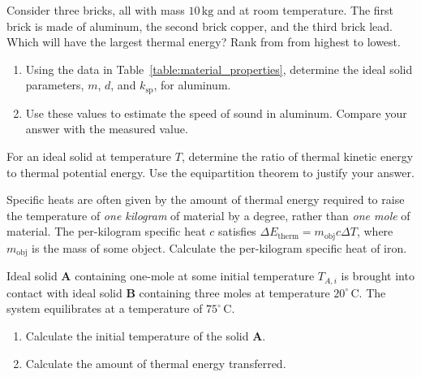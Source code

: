 \begin{exercise}
  Consider three bricks, all with mass $10\,\text{kg}$ and at room
  temperature. The first brick is made of aluminum, the second brick
  copper, and the third brick lead.  Which will have the largest thermal
  energy?  Rank from from highest to lowest.
\label{problem:compare_heat_capacity}
\end{exercise}

\begin{exercise}
\begin{enumerate}
\item Using the data in Table~\ref{table:material_properties}, 
determine the ideal solid
parameters, $m$, $d$, and $k_\text{sp}$, for aluminum.
\item Use these values to estimate the speed of sound in aluminum.  Compare
your answer with the measured value.
\end{enumerate}
\end{exercise}


\begin{exercise}
  For an ideal solid at temperature $T$, determine the ratio of
  thermal kinetic energy to thermal potential energy.  Use the
  equipartition theorem to justify your answer.
\end{exercise}


\begin{exercise}
Specific heats are often given by the amount of thermal energy
required to raise the temperature of \textit{one kilogram} of material by
a degree, rather than \textit{one mole} of material.  The per-kilogram
specific heat $c$ satisfies $\Delta E_\text{therm} = m_\text{obj} c
\Delta T$, where $m_\text{obj}$ is the mass of some object. Calculate
the per-kilogram specific heat of iron.
\end{exercise}


\begin{exercise}
  Ideal solid \textbf{A} containing one-mole at some initial temperature $T_{A,i}$ is
  brought into contact with ideal solid \textbf{B} containing three moles at
  temperature $20^\circ\,\text{C}$.  The system equilibrates at a
  temperature of $75^\circ\,\text{C}$.
\begin{enumerate}
\item Calculate the initial temperature of the solid \textbf{A}.
\item Calculate the amount of thermal energy transferred.
\end{enumerate}
\end{exercise}



